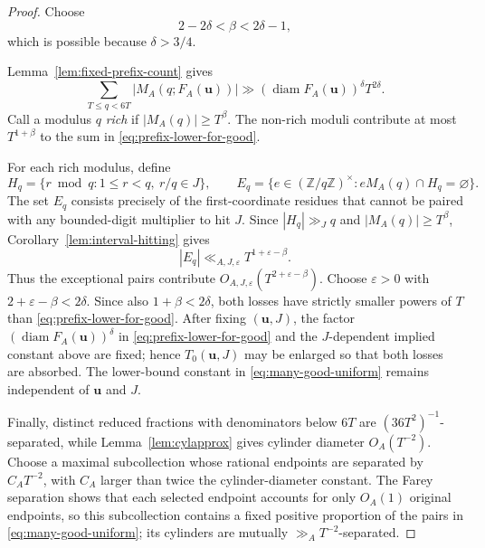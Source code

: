 \documentclass[11pt]{amsart}
\newcommand{\Z}{\mathbb Z}
\newcommand{\eps}{\varepsilon}
\newcommand{\diam}{\operatorname{diam}}
\begin{document}
\begin{proof}
Choose
$$
 2-2\delta<\beta<2\delta-1,
$$
which is possible because $\delta>3/4$.

Lemma~\ref{lem:fixed-prefix-count} gives
\begin{equation}\label{eq:prefix-lower-for-good}
 \sum_{T\le q<6T}|M_A(q;F_A(\mathbf{u}))|
 \gg (\diam F_A(\mathbf{u}))^\delta T^{2\delta}.
\end{equation}
Call a modulus $q$ \emph{rich} if $|M_A(q)|\ge T^\beta$.  The non-rich
moduli contribute at most $T^{1+\beta}$ to the sum in
\eqref{eq:prefix-lower-for-good}.

For each rich modulus, define
$$
 H_q=\{r\bmod q:1\le r<q,\ r/q\in J\},
 \qquad
 E_q=\{e\in(\Z/q\Z)^\times:eM_A(q)\cap H_q=\varnothing\}.
$$
The set $E_q$ consists precisely of the first-coordinate residues that cannot
be paired with any bounded-digit multiplier to hit $J$.  Since
$|H_q|\gg_J q$ and $|M_A(q)|\ge T^\beta$, Corollary~\ref{lem:interval-hitting} gives
$$
 |E_q|\ll_{A,J,\eps}T^{1+\eps-\beta}.
$$
Thus the exceptional pairs contribute
$O_{A,J,\eps}(T^{2+\eps-\beta})$.  Choose $\eps>0$ with
$2+\eps-\beta<2\delta$.  Since also $1+\beta<2\delta$, both losses have
strictly smaller powers of $T$ than \eqref{eq:prefix-lower-for-good}.  After
fixing $(\mathbf{u},J)$, the factor $(\diam F_A(\mathbf{u}))^\delta$ in
\eqref{eq:prefix-lower-for-good} and the $J$-dependent implied constant above
are fixed; hence $T_0(\mathbf{u},J)$ may be enlarged so that both losses are
absorbed.  The lower-bound constant in \eqref{eq:many-good-uniform} remains
independent of $\mathbf{u}$ and $J$.

Finally, distinct reduced fractions with denominators below $6T$ are
$(36T^2)^{-1}$-separated, while Lemma~\ref{lem:cylapprox} gives cylinder
diameter $O_A(T^{-2})$.  Choose a maximal subcollection whose rational
endpoints are separated by $C_AT^{-2}$, with $C_A$ larger than twice the
cylinder-diameter constant.  The Farey separation shows that each selected
endpoint accounts for only $O_A(1)$ original endpoints, so this subcollection
contains a fixed positive proportion of the pairs in
\eqref{eq:many-good-uniform}; its cylinders are mutually $\gg_A T^{-2}$-separated.
\end{proof}
\end{document}
